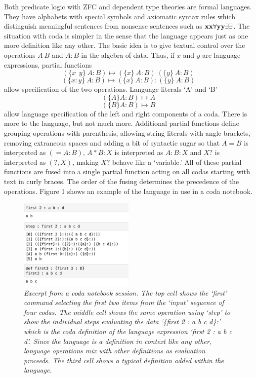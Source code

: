 \documentclass[11pt]{article}
\begin{document}
Both predicate logic with ZFC and dependent type theories are formal languages.  They have alphabets with special symbols
and axiomatic syntax rules which distinguish meaningful sentences from nonsense sentences such as ${\bf xx\forall yy\exists\exists}$.
The situation with coda is simpler in the sense that the language appears just as one more definition like any other.
The basic idea is to give textual control over the operations $A\ B$ and $A:B$ in the algebra of data.
Thus, if $x$ and $y$ are language expressions, partial functions
\begin{equation} \label{eqn}
( \{x\ \ y\} \ A : B ) \mapsto (\{x\}\ A : B)\ (\{y\}\ A : B)
\end{equation}
\begin{equation} \label{eqn}
( \{x : y\} \ A : B ) \mapsto (\{x\}\ A : B):(\{y\}\ A : B)
\end{equation}
allow specification of the two operations.  Language literals `A' and `B'
\begin{equation}\label{eqn}
(\{A\} A:B)\mapsto A
\end{equation}
\begin{equation}\label{eqn}
(\{B\} A:B)\mapsto B
\end{equation}
allow language specification of the left and right components of a coda.  There is more to the language, but not much more.  Additional partial functions
define grouping operations with parenthesis, allowing string literals with angle brackets, removing extraneous spaces and adding a bit of syntactic
sugar so that $A=B$ is interpreted as $(=A:B)$, $A*B:X$ is interpreted as $A:B:X$ and $X?$ is interpreted as $(?,X)$, making $X?$ behave like
a `variable.'  All of these partial functions are fused into a single partial function acting on all codas starting with text in curly braces.  The order of
the fusing determines the precedence of the operations.  Figure 1 shows an example of the language in use in a coda notebook\cite{github}.
\begin{figure}[h]
\centering
\includegraphics[width=0.5\textwidth]{fig1.png}
\caption{{\it Excerpt from a coda notebook session.  The top cell shows the `first' command selecting the first two items from the `input'
sequence of four codas.  The middle cell shows the same operation using `step' to  show the individual steps evaluating the
data `\{first 2 : a b c d\}:' which is the coda definition of the language expression `first 2 : a b c d'.  Since the language is a definition
in context like any other, language operations mix with other definitions as evaluation proceeds.  The third cell shows a typical definition added within the language.}}
\end{figure}
\end{document}
